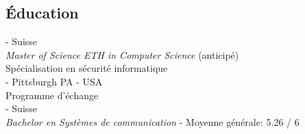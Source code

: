 \documentclass[mm, 11pt]{simple_style}
\begin{document}
\begin{resume}
\section{\'Education}
 - Suisse \\
{\sl Master of Science ETH in Computer Science} (anticip\'e)\\
Sp\'ecialisation en s\'ecurit\'e informatique\\
 - Pittsburgh PA - USA \\
Programme d'\'echange\\
 - Suisse  \\
{\sl Bachelor en Syst\`emes de communication} - Moyenne g\'en\'erale: 5.26 / 6\\
\sectionline

\end{resume}
\end{document}
